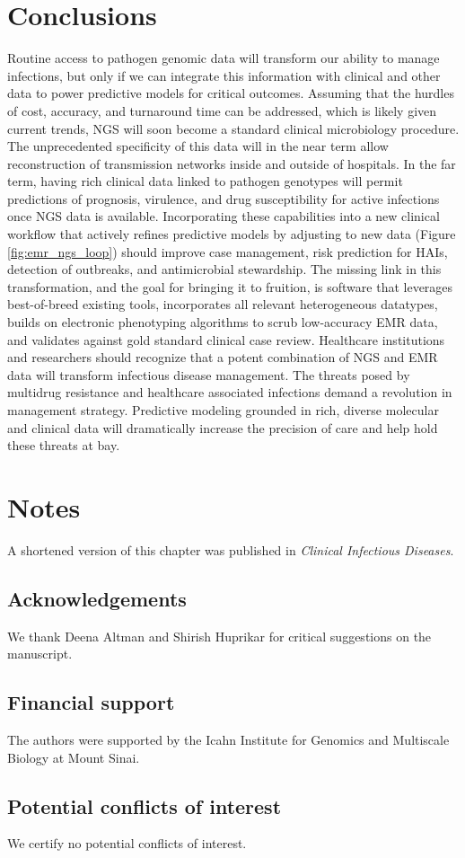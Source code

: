 \section{Conclusions}

Routine access to pathogen genomic data will transform our ability to manage infections, but only if we can integrate this information with clinical and other data to power predictive models for critical outcomes. Assuming that the hurdles of cost, accuracy, and turnaround time can be addressed, which is likely given current trends, NGS will soon become a standard clinical microbiology procedure. The unprecedented specificity of this data will in the near term allow reconstruction of transmission networks inside and outside of hospitals. In the far term, having rich clinical data linked to pathogen genotypes will permit predictions of prognosis, virulence, and drug susceptibility for active infections once NGS data is available. Incorporating these capabilities into a new clinical workflow that actively refines predictive models by adjusting to new data (Figure \ref{fig:emr_ngs_loop}) should improve case management, risk prediction for HAIs, detection of outbreaks, and antimicrobial stewardship. The missing link in this transformation, and the goal for bringing it to fruition, is software that leverages best-of-breed existing tools, incorporates all relevant heterogeneous datatypes, builds on electronic phenotyping algorithms to scrub low-accuracy EMR data, and validates against gold standard clinical case review.
Healthcare institutions and researchers should recognize that a potent combination of NGS and EMR data will transform infectious disease management. The threats posed by multidrug resistance and healthcare associated infections demand a revolution in management strategy. Predictive modeling grounded in rich, diverse molecular and clinical data will dramatically increase the precision of care and help hold these threats at bay.

\section{Notes}

A shortened version of this chapter was published in \textit{Clinical Infectious Diseases}.\autocite{Pak2015}

\subsection{Acknowledgements}

We thank Deena Altman and Shirish Huprikar for critical suggestions on the manuscript.

\subsection{Financial support}

The authors were supported by the Icahn Institute for Genomics and Multiscale Biology at Mount Sinai.

\subsection{Potential conflicts of interest}
We certify no potential conflicts of interest.
